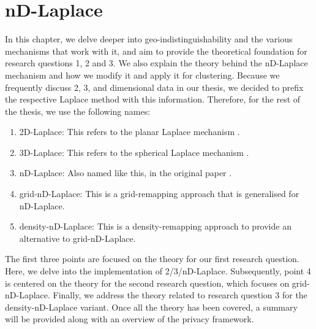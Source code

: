 \chapter{nD-Laplace}
In this chapter, we delve deeper into geo-indistinguishability and the various mechanisms that work with it, and aim to provide the theoretical foundation for research questions 1, 2 and 3.
We also explain the theory behind the nD-Laplace mechanism and how we modify it and apply it for clustering.
Because we frequently discuss 2, 3, and dimensional data in our thesis, we decided to prefix the respective Laplace method with this information.
Therefore, for the rest of the thesis, we use the following names:
\begin{enumerate}
  \item 2D-Laplace: This refers to the planar Laplace mechanism \citep{DBLP:journals/corr/abs-1212-1984}.
  \item 3D-Laplace: This refers to the spherical Laplace mechanism \citep{9646489}.
  \item nD-Laplace: Also named like this, in the original paper \citep{fernandes_generalised_2019}.
  \item grid-nD-Laplace: This is a grid-remapping approach that is generalised for nD-Laplace.
  \item density-nD-Laplace: This is a density-remapping approach to provide an alternative to grid-nD-Laplace.
\end{enumerate}
The first three points are focused on the theory for our first research question. Here, we delve into the implementation of 2/3/nD-Laplace. Subsequently, point 4 is centered on the theory for the second research question, which focuses on grid-nD-Laplace. Finally, we address the theory related to research question 3 for the density-nD-Laplace variant. Once all the theory has been covered, a summary will be provided along with an overview of the privacy framework.
\printnomenclature



\newpage

